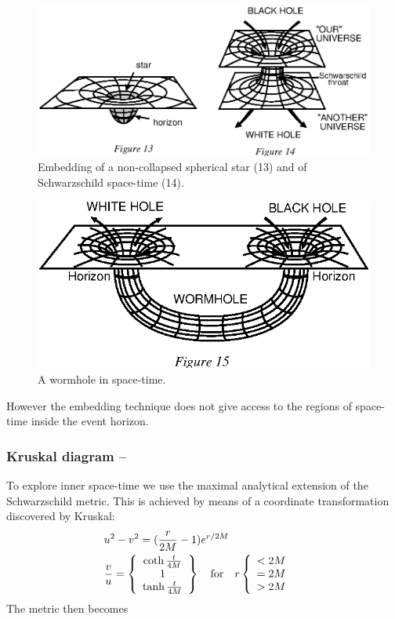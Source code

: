 \documentclass{lamuphys}
\begin{document}
\begin{figure}[htb]
\renewcommand \thefigure {13\&14}
  \begin{center}
    \leavevmode
    \includegraphics{embed.ps}
    \caption{Embedding of a non-collapsed spherical star (13) and of
      Schwarzschild space-time (14).}
  \end{center}
\end{figure}
\setcounter{figure}{14}
\begin{figure}[htb]
  \begin{center}
    \leavevmode
    \includegraphics{worm.ps}      
    \caption{A wormhole in space-time.}
  \end{center}
\end{figure}
However the embedding technique does not give access to the regions of 
space-time inside the event horizon.  

\subsubsection{Kruskal diagram --}

To explore inner space-time we use the maximal analytical extension 
of the Schwarzschild metric. This is achieved by means of a coordinate 
transformation discovered by Kruskal: 
\begin{eqnarray}
\lefteqn{u^{2} - v^{2} = (\frac{r}{2M}-1)e^{r/2M}}\nonumber\\
 & 
\frac{v}{u} = 
\left\{\begin{array}{c}\coth {t\over4M}\\1\\\tanh {t\over4M}\end{array}\right\}
\quad\textrm{for}\quad
r\left\{\begin{array}{c}<2M\\=2M\\>2M\end{array}\right.
\end{eqnarray}
The metric then becomes
\end{document}
